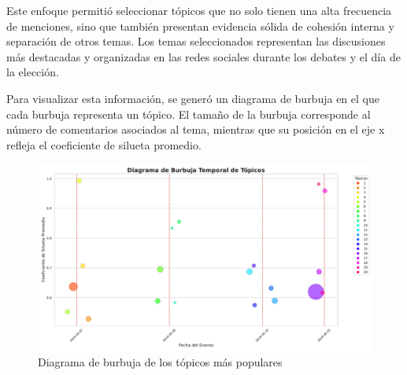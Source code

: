 \documentclass[10pt, a4paper]{article}
\begin{document}
	Este enfoque permitió seleccionar tópicos que no solo tienen una alta frecuencia de menciones, sino que también presentan evidencia sólida de cohesión interna y separación de otros temas. Los temas seleccionados representan las discusiones más destacadas y organizadas en las redes sociales durante los debates y el día de la elección.
	
	Para visualizar esta información, se generó un diagrama de burbuja en el que cada burbuja representa un tópico. El tamaño de la burbuja corresponde al número de comentarios asociados al tema, mientras que su posición en el eje x refleja el coeficiente de silueta promedio.
	
	\begin{figure}[H]
		\centering
		\includegraphics[width=\textwidth]{diagrama_burbuja.pdf}
		\caption{Diagrama de burbuja de los tópicos más populares}
		\label{fig:diagrama_burbuja}
	\end{figure}
	
\end{document}
